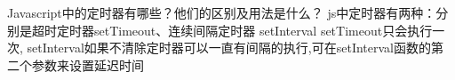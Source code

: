  Javascript中的定时器有哪些？他们的区别及用法是什么？
 js中定时器有两种：分别是超时定时器setTimeout、连续间隔定时器 setInterval
 setTimeout只会执行一次,   setInterval如果不清除定时器可以一直有间隔的执行,可在setInterval函数的第二个参数来设置延迟时间